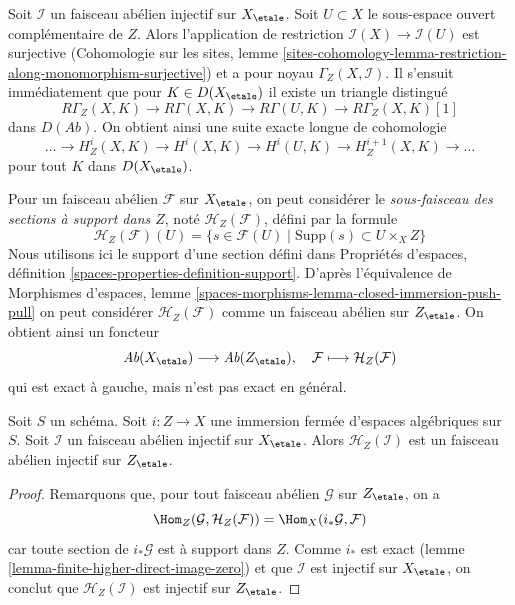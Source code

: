 \medskip\noindent
Soit $\mathcal{I}$ un faisceau abélien injectif sur $X_\etale$. Soit
$U \subset X$ le sous-espace ouvert complémentaire de $Z$.
Alors l'application de restriction $\mathcal{I}(X) \to \mathcal{I}(U)$ est surjective
(Cohomologie sur les sites, lemme
\ref{sites-cohomology-lemma-restriction-along-monomorphism-surjective})
et a pour noyau $\Gamma_Z(X, \mathcal{I})$. Il s'ensuit immédiatement que
pour $K \in D(X_\etale)$ il existe un triangle distingué
$$
R\Gamma_Z(X, K) \to R\Gamma(X, K) \to R\Gamma(U, K) \to R\Gamma_Z(X, K)[1]
$$
dans $D(\textit{Ab})$. On obtient ainsi une suite exacte longue
de cohomologie
$$
\ldots \to H^i_Z(X, K) \to H^i(X, K) \to H^i(U, K) \to
H^{i + 1}_Z(X, K) \to \ldots
$$
pour tout $K$ dans $D(X_\etale)$.

\medskip\noindent
Pour un faisceau abélien $\mathcal{F}$ sur $X_\etale$, on peut considérer
le {\it sous-faisceau des sections à support dans $Z$}, noté
$\mathcal{H}_Z(\mathcal{F})$, défini par la formule
$$
\mathcal{H}_Z(\mathcal{F})(U) =
\{s \in \mathcal{F}(U) \mid \text{Supp}(s) \subset U \times_X Z\}
$$
Nous utilisons ici le support d'une section défini dans
Propriétés d'espaces, définition \ref{spaces-properties-definition-support}.
D'après l'équivalence de Morphismes d'espaces, lemme
\ref{spaces-morphisms-lemma-closed-immersion-push-pull}
on peut considérer $\mathcal{H}_Z(\mathcal{F})$ comme un faisceau abélien sur
$Z_\etale$. On obtient ainsi un foncteur
$$
\textit{Ab}(X_\etale) \longrightarrow \textit{Ab}(Z_\etale),\quad
\mathcal{F} \longmapsto \mathcal{H}_Z(\mathcal{F})
$$
qui est exact à gauche, mais n'est pas exact en général.

\begin{lemma}
\label{lemma-sections-with-support-acyclic}
Soit $S$ un schéma.
Soit $i : Z \to X$ une immersion fermée d'espaces algébriques sur $S$.
Soit $\mathcal{I}$ un faisceau abélien injectif sur $X_\etale$.
Alors $\mathcal{H}_Z(\mathcal{I})$ est un faisceau abélien injectif
sur $Z_\etale$.
\end{lemma}

\begin{proof}
Remarquons que, pour tout faisceau abélien $\mathcal{G}$ sur $Z_\etale$,
on a
$$
\Hom_Z(\mathcal{G}, \mathcal{H}_Z(\mathcal{F})) =
\Hom_X(i_*\mathcal{G}, \mathcal{F})
$$
car toute section de $i_*\mathcal{G}$ est à support dans $Z$.
Comme $i_*$ est exact (lemme \ref{lemma-finite-higher-direct-image-zero})
et que $\mathcal{I}$ est injectif sur $X_\etale$, on conclut que
$\mathcal{H}_Z(\mathcal{I})$ est injectif sur $Z_\etale$.
\end{proof}

